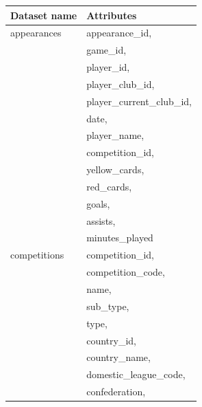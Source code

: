 \documentclass{Configuration_Files/PoliMi3i_thesis}
\begin{document}
\begin{tabular}{|l|p{13cm}|}
	\hline
  \rowcolor{bluepoli!40}
	\textbf{Dataset name} & \textbf{Attributes}                       \\
	\hline
appearances
	                      & appearance\_id,                           \\
	                      & game\_id,                                 \\
	                      & player\_id,                               \\
	                      & player\_club\_id,                         \\
	                      & player\_current\_club\_id,                \\
	                      & date,                                     \\
	                      & player\_name,                             \\
	                      & competition\_id,                          \\
	                      & yellow\_cards,                            \\
	                      & red\_cards,                               \\
	                      & goals,                                    \\
	                      & assists,                                  \\
	                      & minutes\_played                           \\
	\hline
	competitions
	                      & competition\_id,                          \\
	                      & competition\_code,                        \\
	                      & name,                                     \\
	                      & sub\_type,                                \\
	                      & type,                                     \\
	                      & country\_id,                              \\
	                      & country\_name,                            \\
	                      & domestic\_league\_code,                   \\
	                      & confederation,                            \\

\end{tabular}
\end{document}
